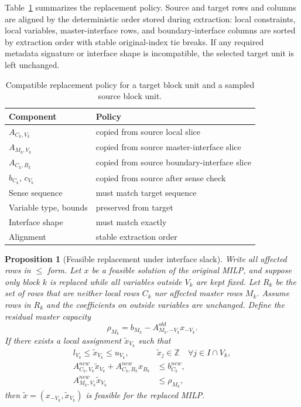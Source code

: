 \documentclass[letterpaper]{article}
\newtheorem{proposition}{Proposition}
\begin{document}
Table~\ref{tab:replacement_policy} summarizes the replacement policy. Source and target rows and columns are aligned by the deterministic order stored during extraction: local constraints, local variables, master-interface rows, and boundary-interface columns are sorted by extraction order with stable original-index tie breaks. If any required metadata signature or interface shape is incompatible, the selected target unit is left unchanged.

\begin{table}[t]
\centering
\small
\setlength{\tabcolsep}{4pt}
\renewcommand{\arraystretch}{1.08}
\caption{Compatible replacement policy for a target block unit and a sampled source block unit.}
\label{tab:replacement_policy}
\begin{tabularx}{\columnwidth}{@{}lX@{}}
\toprule
\textbf{Component} & \textbf{Policy} \\
\midrule
$A_{C_k,V_k}$ & copied from source local slice \\
$A_{M_k,V_k}$ & copied from source master-interface slice \\
$A_{C_k,B_k}$ & copied from source boundary-interface slice \\
$b_{C_k}$, $c_{V_k}$ & copied from source after sense check \\
Sense sequence & must match target sequence \\
Variable type, bounds & preserved from target \\
Interface shape & must match exactly \\
Alignment & stable extraction order \\
\bottomrule
\end{tabularx}
\end{table}

\begin{proposition}[Feasible replacement under interface slack]
\label{prop:feasible_replacement}
Write all affected rows in $\le$ form. Let $x$ be a feasible solution of the original MILP, and suppose only block $k$ is replaced while all variables outside $V_k$ are kept fixed. Let $R_k$ be the set of rows that are neither local rows $C_k$ nor affected master rows $M_k$. Assume rows in $R_k$ and the coefficients on outside variables are unchanged. Define the residual master capacity
\begin{equation}
\rho_{M_k}
=
b_{M_k}-A^{old}_{M_k,-V_k}x_{-V_k}.
\end{equation}
If there exists a local assignment $\tilde{x}_{V_k}$ such that
\begin{align}
l_{V_k}\le \tilde{x}_{V_k}\le u_{V_k},\qquad
&\tilde{x}_j\in\mathbb{Z}\quad \forall j\in I\cap V_k, \label{eq:domain_condition}\\
A^{new}_{C_k,V_k}\tilde{x}_{V_k}
+A^{new}_{C_k,B_k}x_{B_k}
&\le b^{new}_{C_k}, \label{eq:local_condition}\\
A^{new}_{M_k,V_k}\tilde{x}_{V_k}
&\le \rho_{M_k}, \label{eq:master_condition}
\end{align}
then $\tilde{x}=(x_{-V_k},\tilde{x}_{V_k})$ is feasible for the replaced MILP.
\end{proposition}
\end{document}

